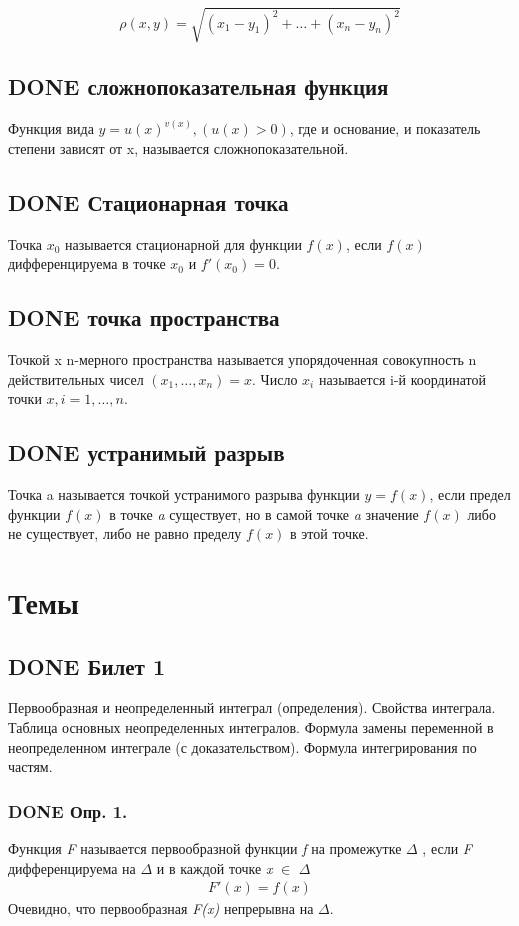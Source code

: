\documentclass[11pt]{article}
\begin{document}
$$\rho(x,y)=\sqrt{(x_1−y_1)^2+…+(x_n−y_n)^2}$$
\subsection{{\bfseries\sffamily DONE} сложнопоказательная функция}
\label{sec:org55c744e}
Функция вида \(y=u(x)^{v(x)},(u(x)>0)\), где и основание, и показатель степени зависят от x, называется сложнопоказательной.
\subsection{{\bfseries\sffamily DONE} Стационарная точка}
\label{sec:org746da37}
Точка \(x_0\) называется стационарной для функции \(f(x)\), если \(f(x)\) дифференцируема в точке \(x_0\) и \(f'(x_0)=0\).
\subsection{{\bfseries\sffamily DONE} точка пространства}
\label{sec:org71feb01}
Точкой x n-мерного пространства называется упорядоченная совокупность n действительных чисел \((x_1,…,x_n)=x\).
Число \(x_i\) называется i-й координатой точки \(x, i=1,…,n\).
\subsection{{\bfseries\sffamily DONE} устранимый разрыв}
\label{sec:orgfc047d5}
Точка a называется точкой устранимого разрыва функции \(y=f(x)\), если предел функции \(f(x)\) в точке \emph{a} существует, но в самой точке \emph{a} значение \(f(x)\) либо не существует, либо не равно пределу \(f(x)\) в этой точке. 
\section{Темы}
\label{sec:org6fa83c7}
\subsection{{\bfseries\sffamily DONE} Билет 1}
\label{sec:org0d9a21a}
Первообразная и неопределенный интеграл (определения). Свойства интеграла. Таблица основных неопределенных интегралов. Формула замены переменной в неопределенном интеграле (с доказательством). Формула интегрирования по частям.
\subsubsection{{\bfseries\sffamily DONE} Опр. 1.}
\label{sec:orgdbb811e}
Функция \emph{F} называется первообразной функции \emph{f} на промежутке \(\Delta\) , если \emph{F} дифференцируема на \(\Delta\) и в каждой точке \emph{x} \(\in\) \(\Delta\)
\begin{eqnarray}
F'(x)=f(x)
\end{eqnarray}
Очевидно, что первообразная \emph{F(x)} непрерывна на \(\Delta\).
\end{document}
